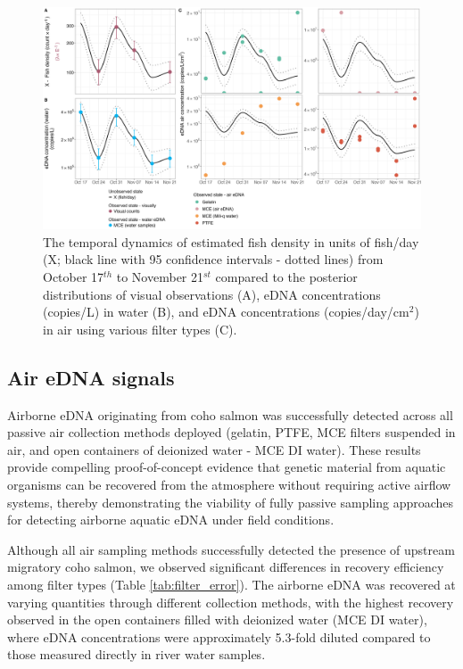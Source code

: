 \documentclass{article}
\begin{document}
\begin{figure}[tbhp] 
\centering
\includegraphics[width=16.5cm]{Plots/Figure_1.jpg}  
\caption{The temporal dynamics of estimated fish density in units of fish/day (X; black line with 95 confidence intervals - dotted lines) from October 17$^{th}$ to November 21$^{st}$ compared to the posterior distributions of visual observations (A), eDNA concentrations (copies/L) in water (B), and eDNA concentrations (copies/day/cm$^2$) in air using various filter types (C).}
\label{fig:fig1}
\end{figure}


\subsection{Air eDNA signals}
Airborne eDNA originating from coho salmon was successfully detected across all passive air collection methods deployed (gelatin, PTFE, MCE filters suspended in air, and open containers of deionized water - MCE DI water). These results provide compelling proof-of-concept evidence that genetic material from aquatic organisms can be recovered from the atmosphere without requiring active airflow systems, thereby demonstrating the viability of fully passive sampling approaches for detecting airborne aquatic eDNA under field conditions.

Although all air sampling methods successfully detected the presence of upstream migratory coho salmon, we observed significant differences in recovery efficiency among filter types (Table \ref{tab:filter_error}). The airborne eDNA was recovered at varying quantities through different collection methods, with the highest recovery observed in the open containers filled with deionized water (MCE DI water), where eDNA concentrations were approximately 5.3-fold diluted compared to those measured directly in river water samples.
\end{document}
